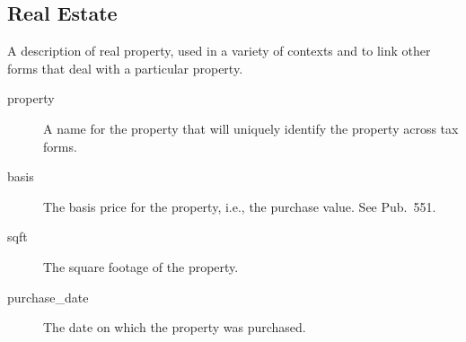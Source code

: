 \documentclass[12pt]{article}
\begin{document}
\subsection{Real Estate}

A description of real property, used in a variety of contexts and to link other
forms that deal with a particular property.

\begin{description}
\item[property] A name for the property that will uniquely identify the property
across tax forms.
\item[basis] The basis price for the property, i.e., the purchase value. See
Pub.\ 551.
\item[sqft] The square footage of the property.
\item[purchase\_date] The date on which the property was purchased.
\end{description}
\end{document}

